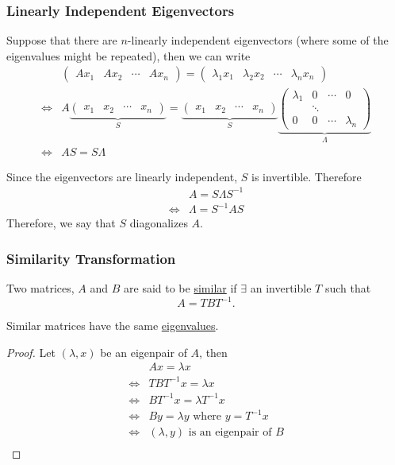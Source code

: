 \documentclass{beamer}
\begin{document}
\begin{frame}\frametitle{Linearly Independent Eigenvectors}
	Suppose that there are $n$-linearly independent eigenvectors (where some of the eigenvalues might be repeated), then we can write
	\begin{align*}
		&
		\begin{pmatrix} 
			Ax_1 & Ax_2 & \cdots & Ax_n
		\end{pmatrix}
		= \begin{pmatrix}
 			\lambda_1x_1 & \lambda_2x_2 & \cdots & \lambda_nx_n
 		  \end{pmatrix}	 \\
 		\iff &
		A 
		\underbrace{
			\begin{pmatrix} 
				x_1 & x_2 & \cdots & x_n
		  	\end{pmatrix}
		}_S
		= \underbrace{
			\begin{pmatrix} 
				x_1 & x_2 & \cdots & x_n
		  	\end{pmatrix}
		  }_S
		  \underbrace{
		  	\begin{pmatrix}
	    		\lambda_1 & 0 & \cdots & 0 \\
	    		& \ddots \\
	    		0 & 0 & \cdots & \lambda_n
	  	  	\end{pmatrix}
	  	  }_{\Lambda} \\
	  	\iff &
	  	AS = S\Lambda
	\end{align*}
	
	Since the eigenvectors are linearly independent, $S$ is invertible.  Therefore
	\begin{align*}
		& A = S\Lambda S^{-1}  \\
		\iff & \Lambda = S^{-1}AS 
	\end{align*}
	Therefore, we say that $S$ diagonalizes $A$.
\end{frame}

\begin{frame}\frametitle{Similarity Transformation}
	\begin{definition}
		Two matrices, $A$ and $B$ are said to be \underline{similar} if
		$\exists $ an invertible $T$ such that 
		\[ 
			A = TBT^{-1}.
		\]		
	\end{definition}

	\begin{lemma}
		Similar matrices have the same \underline{eigenvalues}.	
	\end{lemma}
	\begin{proof}
		Let $(\lambda,x)$ be an eigenpair of $A$, then
		\begin{align*}
			& Ax = \lambda x\\
			\iff & TBT^{-1}x = \lambda x\\
			\iff & BT^{-1}x = \lambda T^{-1}x\\
			\iff & By = \lambda y \text{ where } y = T^{-1}x\\
			\iff & (\lambda,y) \text{ is an eigenpair of }B\\
		\end{align*}		
	\end{proof}
	\end{frame}
	
\end{document}
